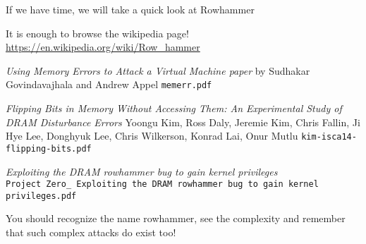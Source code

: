 \documentclass[Screen16to9,17pt]{foils}
\begin{document}
If we have time, we will take a quick look at Rowhammer
\begin{list2}
\item It is enough to browse the wikipedia page! \url{https://en.wikipedia.org/wiki/Row_hammer}

\item \emph{Using Memory Errors to Attack a Virtual Machine paper}
by Sudhakar Govindavajhala and Andrew Appel \verb+memerr.pdf+

\item \emph{Flipping Bits in Memory Without Accessing Them: An Experimental Study of DRAM Disturbance Errors} Yoongu Kim, Ross Daly, Jeremie Kim, Chris Fallin, Ji Hye Lee, Donghyuk Lee, Chris Wilkerson, Konrad Lai, Onur Mutlu
\verb+kim-isca14-flipping-bits.pdf+

\item \emph{Exploiting the DRAM rowhammer bug to gain kernel privileges} \\
 \verb+Project Zero_ Exploiting the DRAM rowhammer bug to gain kernel privileges.pdf+

\end{list2}

You should recognize the name rowhammer, see the complexity and remember that such complex attacks do exist too!


\slidenext
\end{document}
